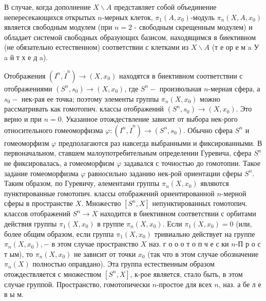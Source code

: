 \documentclass[10pt]{article}
\begin{document}
В случае, когда дополнение $X \backslash A$ представляет собой объединение непересекающихся открытых $n$-мерных клеток, $\pi_{1}\left(A, x_{0}\right)$-модуль $\pi_{n}\left(X, A, x_{0}\right)$ является свободным модулем (при $n=2$ - свободным скрещенным модулем) и обладает системой свободных образующих базисом, находящимся в биективном (не обязательно естественном) соответствии с клетками из $X \backslash A$ (т е ор е м a У a й т х е д a).



Отображения $\left(I^{n}, \dot{I}^{n}\right) \rightarrow\left(X, x_{0}\right)$ находятся в биективном соответствии с отображениями $\left(S^{n}, s_{0}\right) \rightarrow\left(X, x_{0}\right)$, где $S^{n}-$ произвольная $n$-мерная сфера, а $s_{0}-$ нек-рая ее точка; поэтому элементы группы $\pi_{n}\left(X, x_{0}\right)$ можно рассматривать как гомотопич. классы отображений $\left(S^{n}, s_{0}\right) \rightarrow\left(X, x_{0}\right)$. Это верно и при $n=0$. Указанное отождествление зависит от выбора нек-рого относительного гомеоморфизма $\varphi:\left(I^{n}, \dot{I}^{n}\right) \rightarrow\left(S^{n}, s_{0}\right)$. Обычно сфера $S^{n}$ и гомеоморфизм $\varphi$ предполагаются раз навсегда выбранными и фиксированными. В первоначальном, ставшем малоупотребительным определении Гуревича, сфера $S^{n}$ не фиксировалась, а гомеоморфизм $\varphi$ задавался с точностью до гомотопии. Такое задание гомеоморфизма $\varphi$ равносильно заданию нек-рой ориентации сферы $S^{n}$. Таким образом, по Гуревичу, әлементами группы $\pi_{n}\left(X, x_{0}\right)$ являются пунктированные гомотопич. классы отображений ориентированной $n$-мерной сферы в пространстве $X$. Множество $\left[S^{n}, X\right]$ непунктированных гомотопич. классов отображений $S^{n} \rightarrow X$ находится в биективном соответствии с орбитами действия группы $\pi_{1}\left(X, x_{0}\right)$ в группе $\pi_{n}\left(X, x_{0}\right)$. Если $\pi_{1}\left(X, x_{0}\right)=0$ (или, более общим образом, если группа $\pi_{1}\left(X, x_{0}\right)$ тривиально действует на группе $\pi_{n}\left(X, x_{0}\right),-$ в этом случае пространство $X$ наз. г о о о т о п ч е с ки $n$-П р о с т ым), то $\pi_{n}\left(X, x_{0}\right)$ не зависит от точки $x_{0}$ (так что в этом случае обозначение $\pi_{n}(X)$ полностью оправдано). Эта группа естественным образом отождествляется с множеством $\left[S^{n}, X\right]$, к-рое является, стало быть, в этом случае группой. Пространство, гомотопически $n$-простое для всех $n$, наз. а бе л е в ы м.
\end{document}
